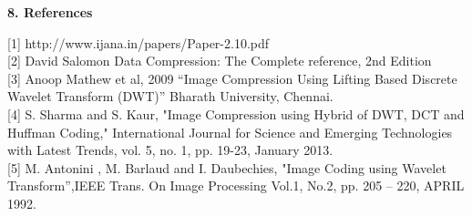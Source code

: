 \documentclass{article}
\begin{document}
\begin{flushleft}
\textbf{\large 8. References}
\end{flushleft}

[1] http://www.ijana.in/papers/Paper-2.10.pdf\\

[2] David Salomon Data Compression: The Complete reference, 2nd Edition\\

[3] Anoop Mathew et al, 2009 “Image Compression Using Lifting Based Discrete Wavelet Transform (DWT)” Bharath University, Chennai.\\

[4] S. Sharma and S. Kaur, "Image Compression using Hybrid of DWT, DCT and Huffman Coding," International Journal for Science and Emerging Technologies with Latest Trends, vol. 5, no. 1, pp. 19-23, January 2013.\\

[5] M. Antonini , M. Barlaud and I. Daubechies, "Image Coding using Wavelet Transform”,IEEE Trans. On Image Processing Vol.1, No.2, pp. 205 – 220, APRIL 1992.
\end{document}

